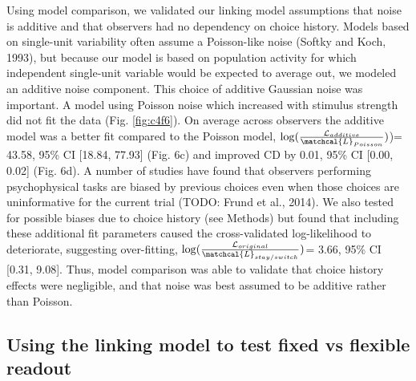\documentclass{report}
\begin{document}
Using model comparison, we validated our linking model assumptions that noise is additive and that observers had no dependency on choice history. Models based on single-unit variability often assume a Poisson-like noise (Softky and Koch, 1993), but because our model is based on population activity for which independent single-unit variable would be expected to average out, we modeled an additive noise component. This choice of additive Gaussian noise was important. A model using Poisson noise which increased with stimulus strength did not fit the data (Fig. \ref{fig:c4f6}). On average across observers the additive model was a better fit compared to the Poisson model, $\log(\frac{\mathcal{L}_{additive}}{\matchcal{L}_{Poisson}})$)= 43.58, 95\% CI [18.84, 77.93] (Fig. 6c) and improved CD by 0.01, 95\% CI [0.00, 0.02] (Fig. 6d). A number of studies have found that observers performing psychophysical tasks are biased by previous choices even when those choices are uninformative for the current trial \citep{Abrahamyan2016-od} (TODO: Frund et al., 2014). We also tested for possible biases due to choice history (see Methods) but found that including these additional fit parameters caused the cross-validated log-likelihood to deteriorate, suggesting over-fitting, $\log(\frac{\mathcal{L}_{original}}{\matchcal{L}_{stay/switch}})$= 3.66, 95\% CI [0.31, 9.08]. Thus, model comparison was able to validate that choice history effects were negligible, and that noise was best assumed to be additive rather than Poisson.

\subsection{Using the linking model to test fixed vs flexible readout}
\end{document}
